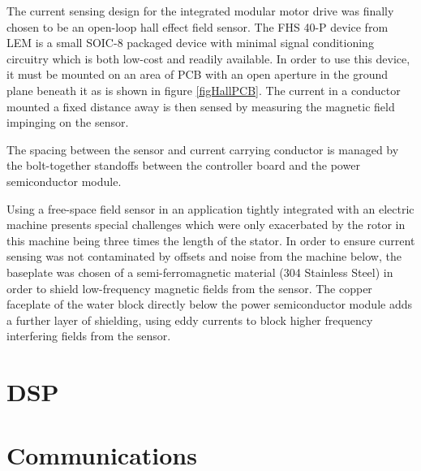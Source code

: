 The current sensing design for the integrated modular motor drive was finally
chosen to be an open-loop hall effect field sensor.
The FHS 40-P device from LEM is a small SOIC-8 packaged device with minimal
signal conditioning circuitry which is both low-cost and readily available.
In order to use this device, it must be mounted on an area of PCB with an open
aperture in the ground plane beneath it as is shown in figure
\ref{figHallPCB}.
The current in a conductor mounted a fixed distance away is then sensed by
measuring the magnetic field impinging on the sensor.

The spacing between the sensor and current carrying conductor is managed by
the bolt-together standoffs between the controller board and the power
semiconductor module.

Using a free-space field sensor in an application tightly integrated with an
electric machine presents special challenges which were only exacerbated by
the rotor in this machine being three times the length of the stator.
In order to ensure current sensing was not contaminated by offsets and noise
from the machine below, the baseplate was chosen of a semi-ferromagnetic
material (304 Stainless Steel) in order to shield low-frequency magnetic
fields from the sensor.
The copper faceplate of the water block directly below the power semiconductor
module adds a further layer of shielding, using eddy currents to block higher
frequency interfering fields from the sensor.

\section{DSP}

\section{Communications}
